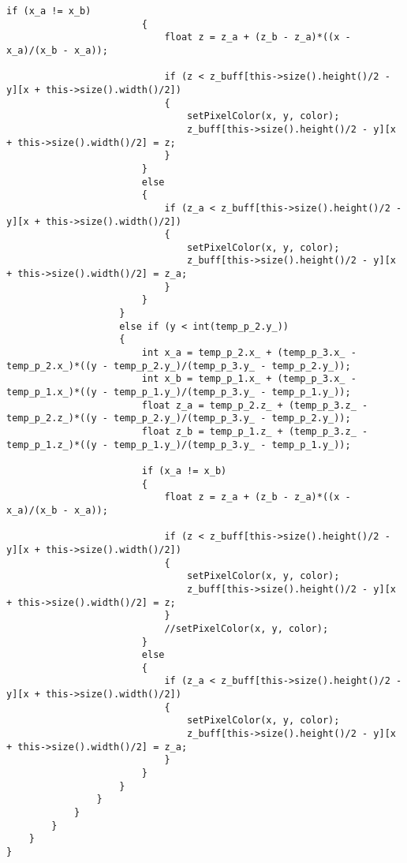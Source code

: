 \begin{lstlisting}[caption = Реализация общего алгоритма отрисовки, label = lst:zbuf]
                        if (x_a != x_b)
                        {
                            float z = z_a + (z_b - z_a)*((x - x_a)/(x_b - x_a));

                            if (z < z_buff[this->size().height()/2 - y][x + this->size().width()/2])
                            {
                                setPixelColor(x, y, color);
                                z_buff[this->size().height()/2 - y][x + this->size().width()/2] = z;
                            }
                        }
                        else
                        {
                            if (z_a < z_buff[this->size().height()/2 - y][x + this->size().width()/2])
                            {
                                setPixelColor(x, y, color);
                                z_buff[this->size().height()/2 - y][x + this->size().width()/2] = z_a;
                            }
                        }
                    }
                    else if (y < int(temp_p_2.y_))
                    {
                        int x_a = temp_p_2.x_ + (temp_p_3.x_ - temp_p_2.x_)*((y - temp_p_2.y_)/(temp_p_3.y_ - temp_p_2.y_));
                        int x_b = temp_p_1.x_ + (temp_p_3.x_ - temp_p_1.x_)*((y - temp_p_1.y_)/(temp_p_3.y_ - temp_p_1.y_));
                        float z_a = temp_p_2.z_ + (temp_p_3.z_ - temp_p_2.z_)*((y - temp_p_2.y_)/(temp_p_3.y_ - temp_p_2.y_));
                        float z_b = temp_p_1.z_ + (temp_p_3.z_ - temp_p_1.z_)*((y - temp_p_1.y_)/(temp_p_3.y_ - temp_p_1.y_));

                        if (x_a != x_b)
                        {
                            float z = z_a + (z_b - z_a)*((x - x_a)/(x_b - x_a));

                            if (z < z_buff[this->size().height()/2 - y][x + this->size().width()/2])
                            {
                                setPixelColor(x, y, color);
                                z_buff[this->size().height()/2 - y][x + this->size().width()/2] = z;
                            }
                            //setPixelColor(x, y, color);
                        }
                        else
                        {
                            if (z_a < z_buff[this->size().height()/2 - y][x + this->size().width()/2])
                            {
                                setPixelColor(x, y, color);
                                z_buff[this->size().height()/2 - y][x + this->size().width()/2] = z_a;
                            }
                        }
                    }
                }
            }
        }
    }
}
\end{lstlisting}

